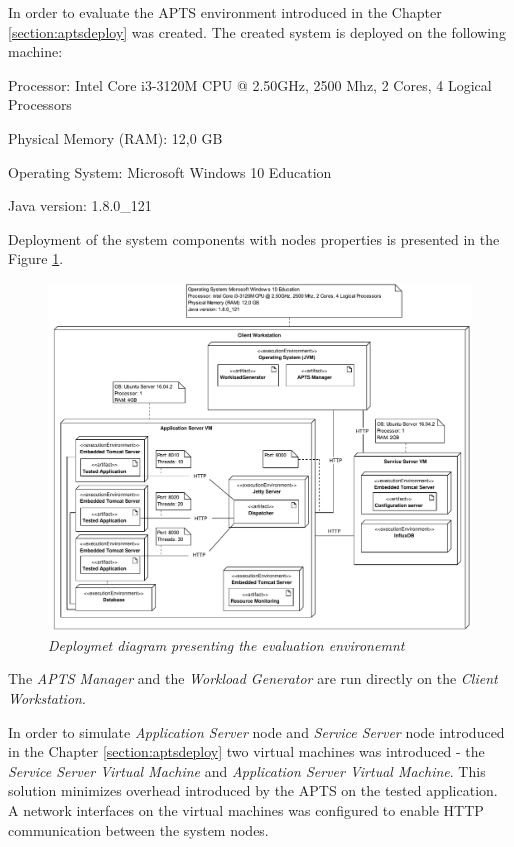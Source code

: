 \documentclass[10pt,a4paper]{article}
\let\tempone\itemize
\let\temptwo\enditemize
\renewenvironment{itemize}{\tempone\addtolength{\itemsep}{-0.4\baselineskip}}{\temptwo}
\begin{document}
In order to evaluate the APTS environment introduced in the Chapter \ref{section:aptsdeploy} was created.
The created system  is deployed on the following machine:
\begin{itemize}
\item Processor: Intel Core i3-3120M CPU @ 2.50GHz, 2500 Mhz, 2 Cores, 4 Logical Processors
\item Physical Memory (RAM): 12,0 GB
\item Operating System: Microsoft Windows 10 Education
\item Java version: 1.8.0\_121
\end{itemize}

Deployment of the system components with nodes properties is presented in the Figure \ref{figure:deployment:evaluation}. 

\begin{figure}[!htb]
\centering
\includegraphics[width=1\textwidth]{ExperimentsEnvironemtDiagram}
\caption{\textit{Deploymet diagram presenting the evaluation environemnt}} \label{figure:deployment:evaluation}
\end{figure}

The \textit{APTS Manager} and the \textit{Workload Generator} are run directly on the \textit{Client Workstation}. 

In order to simulate \textit{Application Server} node and \textit{Service Server} node introduced in the Chapter \ref{section:aptsdeploy} two virtual machines was introduced - the \textit{Service Server Virtual Machine} and \textit{Application Server Virtual Machine}. This solution minimizes overhead introduced by the APTS on the tested application. A network interfaces on the virtual machines was configured to enable HTTP communication between the system nodes. 
\end{document}
